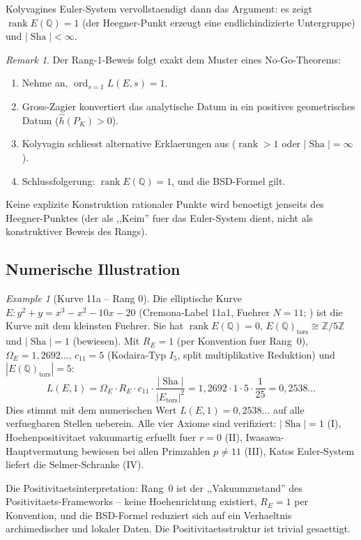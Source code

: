 \documentclass[aps,prd,twocolumn,superscriptaddress,nofootinbib]{revtex4-2}
\theoremstyle{definition}
\theoremstyle{remark}
\newtheorem{remark}[theorem]{Remark}
\newtheorem{example}[theorem]{Example}
\DeclareMathOperator{\ord}{ord}
\DeclareMathOperator{\rank}{rank}
\DeclareMathOperator{\Sha}{Sha}
\begin{document}
Kolyvagines Euler-System vervollstaendigt dann das Argument: es zeigt $\rank E(\mathbb{Q}) = 1$ (der Heegner-Punkt erzeugt eine endlichindizierte Untergruppe) und $|\Sha| < \infty$.

\begin{remark}
Der Rang-1-Beweis folgt exakt dem Muster eines No-Go-Theorems:
\begin{enumerate}
\item Nehme an, $\ord_{s=1} L(E,s) = 1$.
\item Gross-Zagier konvertiert das analytische Datum in ein positives geometrisches Datum ($\hat{h}(P_K) > 0$).
\item Kolyvagin schliesst alternative Erklaerungen aus ($\rank > 1$ oder $|\Sha| = \infty$).
\item Schlussfolgerung: $\rank E(\mathbb{Q}) = 1$, und die BSD-Formel gilt.
\end{enumerate}
Keine explizite Konstruktion rationaler Punkte wird benoetigt jenseits des Heegner-Punktes (der als ,,Keim'' fuer das Euler-System dient, nicht als konstruktiver Beweis des Rangs).
\end{remark}

\subsection{Numerische Illustration}

\begin{example}[Kurve 11a -- Rang 0]
\label{ex:11a}
Die elliptische Kurve $E: y^2 + y = x^3 - x^2 - 10x - 20$ (Cremona-Label 11a1, Fuehrer $N = 11$; \cite{LMFDB}) ist die Kurve mit dem kleinsten Fuehrer. Sie hat $\rank E(\mathbb{Q}) = 0$, $E(\mathbb{Q})_{\mathrm{tors}} \cong \mathbb{Z}/5\mathbb{Z}$ und $|\Sha| = 1$ (bewiesen). Mit $R_E = 1$ (per Konvention fuer Rang~0), $\Omega_E = 1{,}2692\ldots$, $c_{11} = 5$ (Kodaira-Typ $I_5$, split multiplikative Reduktion) und $|E(\mathbb{Q})_{\mathrm{tors}}| = 5$:
\[
  L(E,1) = \Omega_E \cdot R_E \cdot c_{11} \cdot \frac{|\Sha|}{|E_{\mathrm{tors}}|^2}
  = 1{,}2692 \cdot 1 \cdot 5 \cdot \frac{1}{25} = 0{,}2538\ldots
\]
Dies stimmt mit dem numerischen Wert $L(E,1) = 0{,}2538\ldots$ auf alle verfuegbaren Stellen ueberein. Alle vier Axiome sind verifiziert: $|\Sha| = 1$ (I), Hoehenpositivitaet vakuumartig erfuellt fuer $r = 0$ (II), Iwasawa-Hauptvermutung bewiesen bei allen Primzahlen $p \neq 11$ (III), Katos Euler-System liefert die Selmer-Schranke (IV).

Die Positivitaetsinterpretation: Rang~0 ist der ,,Vakuumzustand'' des Positivitaets-Frameworks -- keine Hoehenrichtung existiert, $R_E = 1$ per Konvention, und die BSD-Formel reduziert sich auf ein Verhaeltnis archimedischer und lokaler Daten. Die Positivitaetsstruktur ist trivial gesaettigt.
\end{example}
\end{document}
